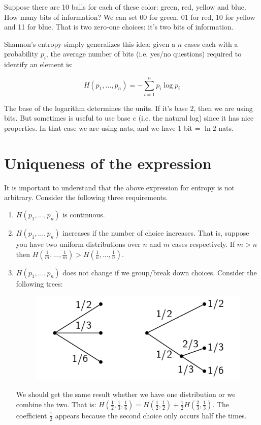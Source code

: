 \documentclass[aps,pra,10pt,floatfix,nofootinbib]{revtex4-1}
\theoremstyle{definition}
\begin{document}
Suppose there are 10 balls for each of these color: green, red, yellow and blue. How many bits of information? We can set 00 for green, 01 for red, 10 for yellow and 11 for blue. That is two zero-one choices: it's two bits of information.

Shannon's entropy simply generalizes this idea: given a $n$ cases each with a probability $p_i$, the average number of bits (i.e. yes/no questions) required to identify an element is:

\begin{equation}
\label{ShannonEntropy}
H(p_1, ..., p_n) = - \sum_{i=1}^{n} p_i \log p_i
\end{equation}

The base of the logarithm determines the units. If it's base $2$, then we are using bits. But sometimes is useful to use base $e$ (i.e. the natural log) since it has nice properties. In that case we are using nats, and we have $1$ bit = $\ln 2$ nats.

\section{Uniqueness of the expression}

It is important to understand that the above expression for entropy is not arbitrary. Consider the following three requirements.

\begin{enumerate}
	\item $H(p_1, ..., p_n)$ is continuous.
	\item $H(p_1, ..., p_n)$ increases if the number of choice increases. That is, suppose you have two uniform distributions over $n$ and $m$ cases respectively. If $m>n$ then $H(\frac{1}{m}, ..., \frac{1}{m})>H(\frac{1}{n}, ..., \frac{1}{n})$.
	\item $H(p_1, ..., p_n)$ does not change if we group/break down choices. Consider the following trees:
	\begin{figure}[h]
	\includegraphics[scale=0.50]{ShannonTree}
	\centering
	\end{figure}
	
	We should get the same result whether we have one distribution or we combine the two. That is: $H(\frac{1}{2}, \frac{1}{3}, \frac{1}{6}) = H(\frac{1}{2},\frac{1}{2}) + \frac{1}{2} H(\frac{2}{3}, \frac{1}{3})$. The coefficient $\frac{1}{2}$ appears because the second choice only occurs half the times.
\end{enumerate}
\end{document}
